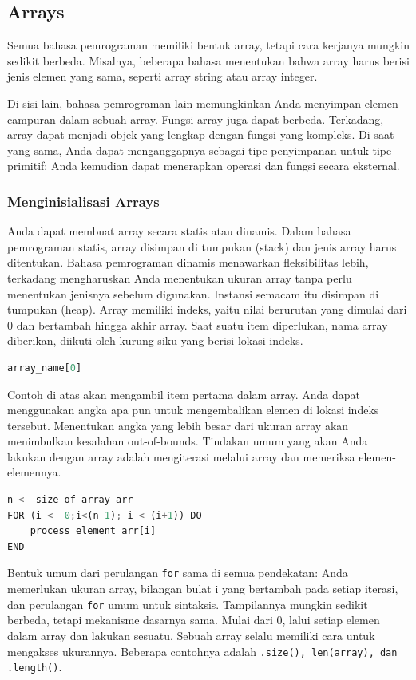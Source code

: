 \documentclass{article}
\begin{document}
\subsection{Arrays}
Semua bahasa pemrograman memiliki bentuk array, tetapi cara kerjanya mungkin sedikit berbeda. Misalnya, beberapa bahasa menentukan bahwa array harus berisi jenis elemen yang sama, seperti array string atau array integer.

Di sisi lain, bahasa pemrograman lain memungkinkan Anda menyimpan elemen campuran dalam sebuah array. Fungsi array juga dapat berbeda. Terkadang, array dapat menjadi objek yang lengkap dengan fungsi yang kompleks. Di saat yang sama, Anda dapat menganggapnya sebagai tipe penyimpanan untuk tipe primitif; Anda kemudian dapat menerapkan operasi dan fungsi secara eksternal.

\subsubsection{Menginisialisasi Arrays}
Anda dapat membuat array secara statis atau dinamis. Dalam bahasa pemrograman statis, array disimpan di tumpukan (stack) dan jenis array harus ditentukan. Bahasa pemrograman dinamis menawarkan fleksibilitas lebih, terkadang mengharuskan Anda menentukan ukuran array tanpa perlu menentukan jenisnya sebelum digunakan. Instansi semacam itu disimpan di tumpukan (heap). Array memiliki indeks, yaitu nilai berurutan yang dimulai dari 0 dan bertambah hingga akhir array. Saat suatu item diperlukan, nama array diberikan, diikuti oleh kurung siku yang berisi lokasi indeks.

\begin{lstlisting}[language=Python, caption={}, captionpos=b]
    array_name[0]
\end{lstlisting}

Contoh di atas akan mengambil item pertama dalam array. Anda dapat menggunakan angka apa pun untuk mengembalikan elemen di lokasi indeks tersebut. Menentukan angka yang lebih besar dari ukuran array akan menimbulkan kesalahan out-of-bounds. Tindakan umum yang akan Anda lakukan dengan array adalah mengiterasi melalui array dan memeriksa elemen-elemennya.
\begin{lstlisting}[language=Python, caption={}, captionpos=b]
n <- size of array arr
FOR (i <- 0;i<(n-1); i <-(i+1)) DO
    process element arr[i]
END
\end{lstlisting}

Bentuk umum dari perulangan \verb|for| sama di semua pendekatan: Anda memerlukan ukuran array, bilangan bulat i yang bertambah pada setiap iterasi, dan perulangan \verb|for| umum untuk sintaksis. Tampilannya mungkin sedikit berbeda, tetapi mekanisme dasarnya sama. Mulai dari 0, lalui setiap elemen dalam array dan lakukan sesuatu. Sebuah array selalu memiliki cara untuk mengakses ukurannya. Beberapa contohnya adalah \verb|.size(), len(array), dan .length()|.
\end{document}
